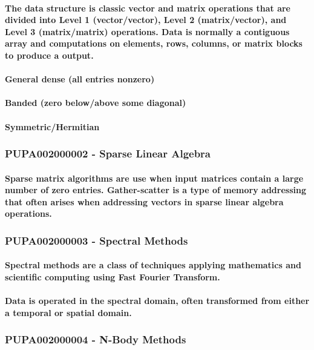 \documentclass{acm_proc_article-sp}
\begin{document}
\paragraph{The data structure is classic vector and matrix operations that are divided into Level 1 (vector/vector), Level 2 (matrix/vector), and Level 3 (matrix/matrix) operations. Data is normally a contiguous array and computations on elements, rows, columns, or matrix blocks to produce a output.}
\paragraph{General dense (all entries nonzero)}
\paragraph{Banded (zero below/above some diagonal)}
\paragraph{Symmetric/Hermitian}
\subsubsection{PUPA002000002 - Sparse Linear Algebra}
\paragraph{Sparse matrix algorithms are use when input matrices contain a large number of zero entries. Gather-scatter is a type of memory addressing that often arises when addressing vectors in sparse linear algebra operations.}
\subsubsection{PUPA002000003 - Spectral Methods}
\paragraph{Spectral methods are a class of techniques applying mathematics and scientific computing using Fast Fourier Transform.}
\paragraph{Data is operated in the spectral domain, often transformed from either a temporal or spatial domain.}
\subsubsection{PUPA002000004 - N-Body Methods}
\end{document}
